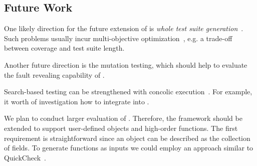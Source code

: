 
\subsection{Future Work}
\label{subsec.fut.work}

One likely direction for the future extension of \Jedi is \emph{whole test suite generation}~\cite{fraser2013whole}. Such problems usually incur multi-objective optimization~\cite{lakhotia2007multi,panichella2017lips}, e.g. a trade-off between coverage and test suite length.

Another future direction is the mutation testing\cite{fraser2012mutation}, which should help to evaluate the fault revealing capability of \Jedi.

Search-based testing can be strengthened with concolic execution~\cite{baars2011symbolic, galeotti2013improving}. For example, it worth of investigation how to integrate \Jalangi into \Jedi.

We plan to conduct larger evaluation of \Jedi. Therefore, the framework should be extended to support user-defined objects and high-order functions. The first requirement is straightforward since an object can be described as the collection of fields. To generate functions as inputs we could employ an approach similar to QuickCheck~\cite{koopman2006automatic}.

